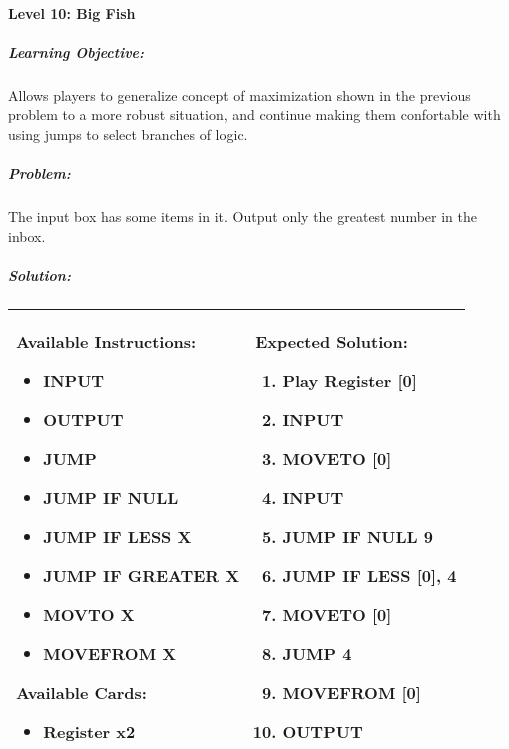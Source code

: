 \paragraph{Level 10: Big Fish}
\subparagraph{Learning Objective:} Allows players to generalize concept of maximization shown in the previous problem to a more robust situation, and continue making them confortable with using jumps to select branches of logic.

\subparagraph{Problem:} The input box has some items in it. Output only the greatest number in the inbox.

\subparagraph{Solution:} 
\begin{center}
    \begin{tabular}{ | m{5cm} | m{9cm} | } 
        \hline
            \textbf{Available Instructions:} 
            \begin{itemize}
                \setlength\itemsep{-.35em}
                \item INPUT
                \item OUTPUT
                \item JUMP
                \item JUMP IF NULL
                \item JUMP IF LESS X
                \item JUMP IF GREATER X
                \item MOVTO X
                \item MOVEFROM X
            \end{itemize}
            \textbf{Available Cards:} 
            \begin{itemize}
                \setlength\itemsep{-.35em}
                \item Register x2
            \end{itemize}& 
            \textbf{Expected Solution:} 
            \begin{enumerate}
                \setlength\itemsep{-.35em}
                \item Play Register [0]
                \item INPUT
                \item MOVETO [0]
                \item INPUT
                \item JUMP IF NULL 9
                \item JUMP IF LESS [0], 4
                \item MOVETO [0]
                \item JUMP 4
                \item MOVEFROM [0]
                \item OUTPUT
            \end{enumerate}
            \\
        \hline
    \end{tabular}
\end{center}

